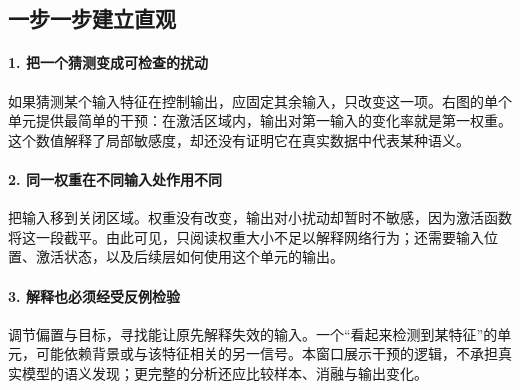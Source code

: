\subsection*{一步一步建立直观}

\paragraph{1. 把一个猜测变成可检查的扰动}

如果猜测某个输入特征在控制输出，应固定其余输入，只改变这一项。右图的单个单元提供最简单的干预：在激活区域内，输出对第一输入的变化率就是第一权重。这个数值解释了局部敏感度，却还没有证明它在真实数据中代表某种语义。



\paragraph{2. 同一权重在不同输入处作用不同}

把输入移到关闭区域。权重没有改变，输出对小扰动却暂时不敏感，因为激活函数将这一段截平。由此可见，只阅读权重大小不足以解释网络行为；还需要输入位置、激活状态，以及后续层如何使用这个单元的输出。



\paragraph{3. 解释也必须经受反例检验}

调节偏置与目标，寻找能让原先解释失效的输入。一个“看起来检测到某特征”的单元，可能依赖背景或与该特征相关的另一信号。本窗口展示干预的逻辑，不承担真实模型的语义发现；更完整的分析还应比较样本、消融与输出变化。
